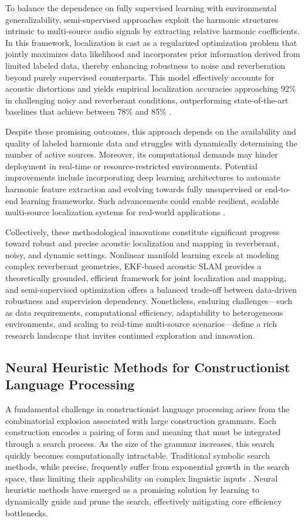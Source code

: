 To balance the dependence on fully supervised learning with environmental generalizability, semi-supervised approaches exploit the harmonic structures intrinsic to multi-source audio signals by extracting relative harmonic coefficients. In this framework, localization is cast as a regularized optimization problem that jointly maximizes data likelihood and incorporates prior information derived from limited labeled data, thereby enhancing robustness to noise and reverberation beyond purely supervised counterparts. This model effectively accounts for acoustic distortions and yields empirical localization accuracies approaching 92\% in challenging noisy and reverberant conditions, outperforming state-of-the-art baselines that achieve between 78\% and 85\% \cite{ref52}.

Despite these promising outcomes, this approach depends on the availability and quality of labeled harmonic data and struggles with dynamically determining the number of active sources. Moreover, its computational demands may hinder deployment in real-time or resource-restricted environments. Potential improvements include incorporating deep learning architectures to automate harmonic feature extraction and evolving towards fully unsupervised or end-to-end learning frameworks. Such advancements could enable resilient, scalable multi-source localization systems for real-world applications \cite{ref52}.

Collectively, these methodological innovations constitute significant progress toward robust and precise acoustic localization and mapping in reverberant, noisy, and dynamic settings. Nonlinear manifold learning excels at modeling complex reverberant geometries, EKF-based acoustic SLAM provides a theoretically grounded, efficient framework for joint localization and mapping, and semi-supervised optimization offers a balanced trade-off between data-driven robustness and supervision dependency. Nonetheless, enduring challenges—such as data requirements, computational efficiency, adaptability to heterogeneous environments, and scaling to real-time multi-source scenarios—define a rich research landscape that invites continued exploration and innovation.

\subsection{Neural Heuristic Methods for Constructionist Language Processing}

A fundamental challenge in constructionist language processing arises from the combinatorial explosion associated with large construction grammars. Each construction encodes a pairing of form and meaning that must be integrated through a search process. As the size of the grammar increases, this search quickly becomes computationally intractable. Traditional symbolic search methods, while precise, frequently suffer from exponential growth in the search space, thus limiting their applicability on complex linguistic inputs \cite{ref40}. Neural heuristic methods have emerged as a promising solution by learning to dynamically guide and prune the search, effectively mitigating core efficiency bottlenecks.

